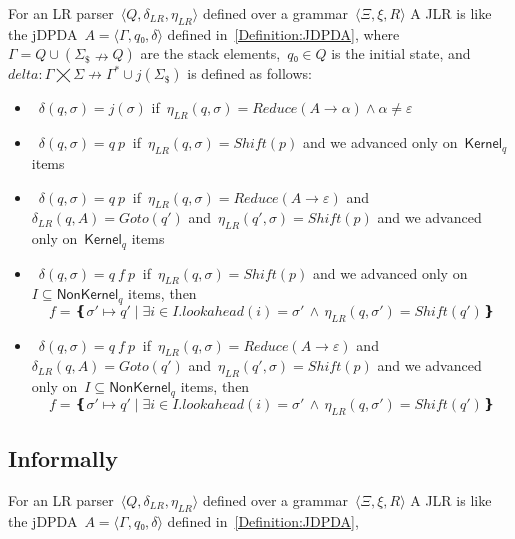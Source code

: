 For an LR parser~$⟨Q,δ_{LR}, η_{LR}⟩$ defined over a grammar~$⟨Ξ,ξ,R⟩$
A JLR is like the jDPDA~$A=⟨Γ,q₀,δ⟩$ defined in~\cref{Definition:JDPDA},
  where~$Γ= Q∪(Σ_\$↛Q)$ are the stack elements,~$q₀∈Q$
  is the initial state, and~$delta:Γ⨉Σ↛Γ^*∪j(Σ_\$)$ is defined as follows:
  \begin{itemize}
   \item~$δ(q,σ)= j(σ)$ if~$η_{LR}(q,σ)=Reduce(A→α)∧α≠ε$


   \item~$δ(q,σ)= q \: p~$ if~$η_{LR}(q,σ)=Shift(p)$ and we advanced only on~$\textsf{Kernel}_q$ items
   \item~$δ(q,σ)= q \: p~$ if~$η_{LR}(q,σ)=Reduce(A→ε)$
     and~$δ_{LR}(q,A)=Goto(q')$ and~$η_{LR}(q',σ)=Shift(p)$
     and we advanced only on~$\textsf{Kernel}_q$ items


   \item~$δ(q,σ)= q \: f \: p~$ if~$η_{LR}(q,σ)=Shift(p)$ and we advanced only on~$I⊆\textsf{NonKernel}_q$
     items, then
    \[
      f = ❴σ'↦q' \; | \;∃i∈I. lookahead(i)=σ' \,∧\, η_{LR}(q,σ')=Shift(q')❵
    \]

   \item~$δ(q,σ)= q \: f \: p~$ if~$η_{LR}(q,σ)=Reduce(A→ε)$
     and~$δ_{LR}(q,A)=Goto(q')$ and~$η_{LR}(q',σ)=Shift(p)$
     and we advanced only on~$I⊆\textsf{NonKernel}_q$
     items, then
     \[
      f = ❴σ'↦q' \; | \;∃i∈I. lookahead(i)=σ' \,∧\, η_{LR}(q,σ')=Shift(q')❵
     \]

  \end{itemize}
\subsection{Informally}

For an LR parser~$⟨Q,δ_{LR}, η_{LR}⟩$ defined over a grammar~$⟨Ξ,ξ,R⟩$
A JLR is like the jDPDA~$A=⟨Γ,q₀,δ⟩$ defined in~\cref{Definition:JDPDA},

